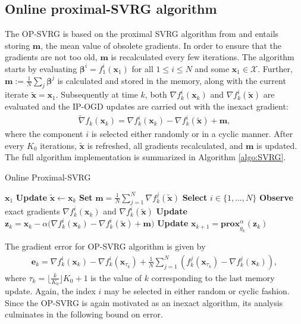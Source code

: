 \documentclass[draftcls,onecolumn,12pt]{IEEEtran}
\theoremstyle{plain}
\def\x{\mathbf{x}}
\def\e{\mathbf{e}}
\def\cX {\mathcal{X}}
\def\z{\mathbf{z}}
\def\m{\boldsymbol{m}}
\def \nt {\tilde{\nabla}}
\def\bt{\boldsymbol{\beta}}
\def\prox{\textbf{prox}}
\providecommand{\pk}[1]{\prox_{g_k}^\alpha\!\!\left(#1\right)}
\theoremstyle{plain}
\theoremstyle{remark}
\begin{document}
\subsection{Online proximal-SVRG algorithm}\label{secsvrg}
The OP-SVRG is based on the proximal SVRG algorithm from \cite{defazio2014saga} and entails storing $\m$, the mean value of obsolete gradients. In order to ensure that the gradients are not too old, $\m$ is recalculated every few iterations. The algorithm starts by evaluating $\bt^i = f_1^i(\x_1)$ for all $1\leq i \leq N$ and some $\x_1 \in \cX$. Further, $\m:=\frac{1}{N}\sum_j \bt^j$ is calculated and stored in the memory, along with the current iterate $\tilde{\x}=\x_1$. Subsequently at time $k$, both
$\nabla f_k^i(\x_k)$ and $\nabla f_k^i(\tilde{\x})$ are evaluated and the IP-OGD updates are carried out with the inexact gradient:
\begin{align}
\nt f_k(\x_k) = \nabla f_k^i(\x_k) - \nabla f_k^i(\tilde{\x}) + \m,
\end{align}
where the component $i$ is selected either randomly or in a cyclic manner. After every $K_0$ iterations, $\tilde{\x}$ is refreshed, all gradients recalculated, and $\m$ is updated. The full algorithm implementation is summarized in Algorithm \ref{algo:SVRG}. 

   \begin{algorithm}
	  	\caption{Online Proximal-SVRG}\label{algo:SVRG}
	  	\begin{algorithmic}[1]
	  		 $\x_1$ %
					\STATE \textbf{Update} $\tilde{\x} \leftarrow \x_k$
					\STATE \textbf{Set} $\m = \frac{1}{N}\sum_{j=1}^N\nabla f_k^j(\tilde{\x})$ 
				\ENDIF 
	  		\STATE \textbf{Select} $i \in \{1, \ldots, N\}$ \label{isvrg}  	  		
	  		\STATE \textbf{Observe} exact gradients $\nabla f_k^i(\x_k)$ and $\nabla f_k^i(\tilde{\x})$ 
	  	   \STATE \textbf{Update} $\z_{k} = \x_{k} - \alpha \big(\nabla f_k^{i}(\x_k)-\nabla f_k^i(\tilde{\x}) + \m \big) $   		
	  		\STATE \textbf{Update} $\x_{k+1} = \pk{\z_k}$
				\ENDFOR
				\end{algorithmic}
	\end{algorithm}	  
	
The gradient error for OP-SVRG algorithm is given by 
\begin{align}
\!\!\!\e_k \!= \!\nabla f_k^i(\x_k)\!-\!\nabla f_k^i(\x_{\tau_k}) \!\!+\!\! \frac{1}{N}\!\!\sum\limits_{j=1}^{N}(f_k^j(\x_{\tau_k}) \!-\! \nabla f^j_k(\x_k)), \label{error_svrg}
\end{align}
where $\tau_k = \lfloor \frac{k}{K_0}\rfloor K_0 + 1$ is the value of $k$ corresponding to the last memory update. Again, the index $i$ may be selected in either random or cyclic fashion. Since the OP-SVRG is again motivated as an inexact algorithm, its analysis culminates in the following bound on error. 
\end{document}
